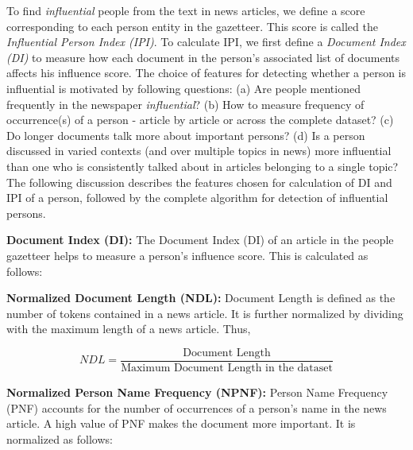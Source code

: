 To find \emph{influential} people from the text in news articles, we define a score corresponding to each person entity in the gazetteer. This score is called the \emph{Influential Person Index (IPI)}. To calculate IPI, we first define a \emph{Document Index (DI)} to measure how each document in the person's associated list of documents affects his influence score. The choice of features for detecting whether a person is influential is motivated by following questions: (a) Are people mentioned frequently in the newspaper \emph{influential}? (b) How to measure frequency of occurrence(s) of a person - article by article or across the complete dataset? (c) Do longer documents talk more about important persons? (d) Is a person discussed in varied contexts (and over multiple topics in news) more influential than one who is consistently talked about in articles belonging to a single topic?  The following discussion describes the features chosen for calculation of DI and IPI of a person, followed by the complete algorithm for detection of influential persons.

\noindent \textbf{Document Index (DI): }
The Document Index (DI) of an article in the people gazetteer helps to measure a person's influence score. This is calculated as follows:

\noindent \textbf{Normalized Document Length (NDL): } 
Document Length is defined as the number of tokens contained in a news article. It is further normalized by dividing with the maximum length of a news article. Thus,  

$$NDL=\dfrac{\text{Document Length}} {\text{Maximum Document Length in the dataset}}$$



\noindent \textbf{ Normalized Person Name Frequency (NPNF): }
Person Name Frequency (PNF) accounts for the number of occurrences of a person's name in the news article. A high value of PNF makes the document more important. It is normalized as follows:

